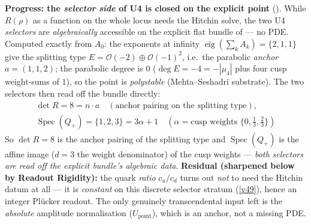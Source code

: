 \par\smallskip\noindent\textbf{Progress: the \emph{selector side} of U4 is closed on the explicit point} (\mE).
While $R(\rho)$ as a function on the whole locus needs the Hitchin solve, the two U4 \emph{selectors} are
\emph{algebraically} accessible on the explicit flat bundle of  --- no
PDE. Computed exactly from $A_0$: the exponents at infinity $\operatorname{eig}(\sum_kA_k)=\{2,1,1\}$ give
the splitting type $E=\mathcal O(-2)\oplus\mathcal O(-1)^2$, i.e.\ the parabolic \emph{anchor} $a=(1,1,2)$;
the parabolic degree is $0$ ($\deg E=-4=-|\mu_4|$ plus four cusp weight-sums of $1$), so the point is
\emph{polystable} (Mehta--Seshadri substrate). The two selectors then read off the bundle directly:
\[
  \boxed{\ \begin{gathered}
  \det R=8=n\!\cdot\!a\quad(\text{anchor pairing on the splitting type}),\\[2pt]
  \operatorname{Spec}(Q_+)=\{1,2,3\}=3\alpha+1\quad(\alpha=\text{cusp weights }\{0,\tfrac13,\tfrac23\})
  \end{gathered}\ }
\]
So $\det R=8$ is the anchor pairing of the splitting type and $\operatorname{Spec}(Q_+)$ is the affine image
($d{=}3$ the weight denominator) of the cusp weights --- \emph{both selectors are read off the explicit
bundle's algebraic data}. \textbf{Residual (sharpened below by Readout Rigidity):} the quark \emph{ratio}
$c_u/c_d$ turns out \emph{not} to need the Hitchin datum at all --- it is \emph{constant} on this discrete
selector stratum (\vref{v49}), hence an integer Pl\"ucker readout. The only genuinely transcendental input left is
the \emph{absolute} amplitude normalisation ($U_{\mathrm{point}}$), which is an anchor, not a missing PDE.


